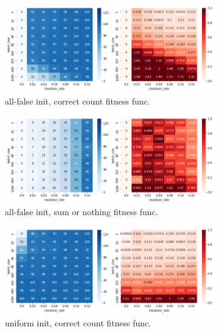 \documentclass[a4paper,10pt]{article}
\begin{document}
\begin{figure}[!htb]
\centering
\begin{subfigure}{.49\linewidth}
    \includegraphics[width=\linewidth]{images/pilot_allfalse_correct_count.png}
    \caption{all-false init, correct count fitness func.}
\end{subfigure}
\begin{subfigure}{.49\linewidth}
    \includegraphics[width=\linewidth]{images/pilot_allfalse_sum_or_nothing.png}
    \caption{all-false init, sum or nothing fitness func.}
\end{subfigure}
\hfill
\begin{subfigure}{.49\linewidth}
    \includegraphics[width=\linewidth]{images/pilot_uniform_correct_count.png}
    \caption{uniform init, correct count fitness func.}
\end{subfigure}
\begin{subfigure}{.49\linewidth}

\end{subfigure}
\end{figure}
\end{document}
